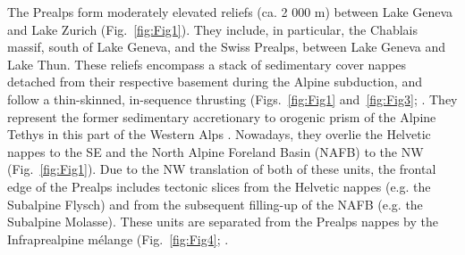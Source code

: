 \documentclass[twoside]{article}
\begin{document}
The Prealps form moderately elevated reliefs (ca. 2 000 m) between Lake Geneva and Lake Zurich (Fig.~\ref{fig:Fig1}). They include, in particular, the Chablais massif, south of Lake Geneva, and the Swiss Prealps, between Lake Geneva and Lake Thun. These reliefs encompass a stack of sedimentary cover nappes detached from their respective basement during the Alpine subduction, and follow a thin-skinned, in-sequence thrusting (Figs.~\ref{fig:Fig1} and~\ref{fig:Fig3}; \citealp{Mosar1991,Wissing2002}. They represent the former sedimentary accretionary to orogenic prism of the Alpine Tethys in this part of the Western Alps \citep{Stampfli1998,Handy2010}. Nowadays, they overlie the Helvetic nappes to the SE and the North Alpine Foreland Basin (NAFB) to the NW (Fig.~\ref{fig:Fig1}). Due to the NW translation of both of these units, the frontal edge of the Prealps includes tectonic slices from the Helvetic nappes (e.g. the Subalpine Flysch) and from the subsequent filling-up of the NAFB (e.g. the Subalpine Molasse). These units are separated from the Prealps nappes by the Infraprealpine mélange (Fig.~\ref{fig:Fig4}; \citealp{Jeanbourquin1992}.\par
\medskip

\end{document}
